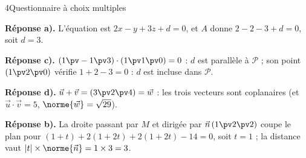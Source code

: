 \begin{corrigeBac}{4}{Questionnaire à choix multiples}
\begin{questions}
  \item \textbf{Réponse a).} L'équation est $2x-y+3z+d=0$, et $A$ donne $2-2-3+d=0$, soit $d=3$. \pts{1 pt}
  \item \textbf{Réponse c).} $(1\pv-1\pv3)\cdot(1\pv1\pv0)=0$ : $d$ est parallèle à $\mathcal{P}$ ; son point $(1\pv2\pv0)$ vérifie
    $1+2-3=0$ : $d$ est incluse dans $\mathcal{P}$. \pts{1 pt}
  \item \textbf{Réponse d).} $\vec u+\vec v=(3\pv2\pv4)=\vec w$ : les trois vecteurs sont coplanaires (et $\vec u\cdot\vec v=5$,
    $\norme{\vec w}=\sqrt{29}$). \pts{1 pt}
  \item \textbf{Réponse b).} La droite passant par $M$ et dirigée par $\vec n\,(1\pv2\pv2)$ coupe le plan pour
    $(1+t)+2(1+2t)+2(1+2t)-14=0$, soit $t=1$ ; la distance vaut $|t|\times\norme{\vec n}=1\times3=3$. \pts{1 pt}
\end{questions}
\end{corrigeBac}

